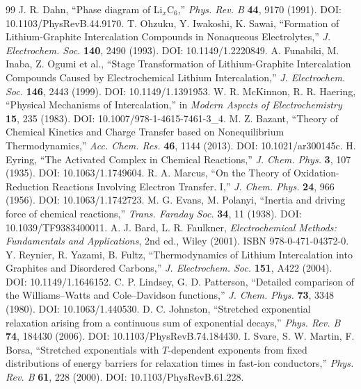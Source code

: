 \documentclass[11pt,a4paper]{article}
\begin{document}
\begin{thebibliography}{99}
 J. R. Dahn, ``Phase diagram of Li$_x$C$_6$,'' \emph{Phys. Rev. B} \textbf{44}, 9170 (1991). DOI: 10.1103/PhysRevB.44.9170.
 T. Ohzuku, Y. Iwakoshi, K. Sawai, ``Formation of Lithium-Graphite Intercalation Compounds in Nonaqueous Electrolytes,'' \emph{J. Electrochem. Soc.} \textbf{140}, 2490 (1993). DOI: 10.1149/1.2220849.
 A. Funabiki, M. Inaba, Z. Ogumi et al., ``Stage Transformation of Lithium-Graphite Intercalation Compounds Caused by Electrochemical Lithium Intercalation,'' \emph{J. Electrochem. Soc.} \textbf{146}, 2443 (1999). DOI: 10.1149/1.1391953.
 W. R. McKinnon, R. R. Haering, ``Physical Mechanisms of Intercalation,'' in \emph{Modern Aspects of Electrochemistry} \textbf{15}, 235 (1983). DOI: 10.1007/978-1-4615-7461-3\_4.
 M. Z. Bazant, ``Theory of Chemical Kinetics and Charge Transfer based on Nonequilibrium Thermodynamics,'' \emph{Acc. Chem. Res.} \textbf{46}, 1144 (2013). DOI: 10.1021/ar300145c.
 H. Eyring, ``The Activated Complex in Chemical Reactions,'' \emph{J. Chem. Phys.} \textbf{3}, 107 (1935). DOI: 10.1063/1.1749604.
 R. A. Marcus, ``On the Theory of Oxidation-Reduction Reactions Involving Electron Transfer. I,'' \emph{J. Chem. Phys.} \textbf{24}, 966 (1956). DOI: 10.1063/1.1742723.
 M. G. Evans, M. Polanyi, ``Inertia and driving force of chemical reactions,'' \emph{Trans. Faraday Soc.} \textbf{34}, 11 (1938). DOI: 10.1039/TF9383400011.
 A. J. Bard, L. R. Faulkner, \emph{Electrochemical Methods: Fundamentals and Applications}, 2nd ed., Wiley (2001). ISBN 978-0-471-04372-0.
 Y. Reynier, R. Yazami, B. Fultz, ``Thermodynamics of Lithium Intercalation into Graphites and Disordered Carbons,'' \emph{J. Electrochem. Soc.} \textbf{151}, A422 (2004). DOI: 10.1149/1.1646152.
 C. P. Lindsey, G. D. Patterson, ``Detailed comparison of the Williams--Watts and Cole--Davidson functions,'' \emph{J. Chem. Phys.} \textbf{73}, 3348 (1980). DOI: 10.1063/1.440530.
 D. C. Johnston, ``Stretched exponential relaxation arising from a continuous sum of exponential decays,'' \emph{Phys. Rev. B} \textbf{74}, 184430 (2006). DOI: 10.1103/PhysRevB.74.184430.
 I. Svare, S. W. Martin, F. Borsa, ``Stretched exponentials with $T$-dependent exponents from fixed distributions of energy barriers for relaxation times in fast-ion conductors,'' \emph{Phys. Rev. B} \textbf{61}, 228 (2000). DOI: 10.1103/PhysRevB.61.228.

\end{thebibliography}
\end{document}
